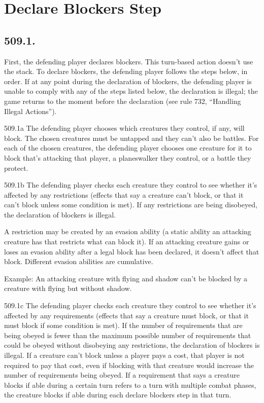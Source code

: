 \section{Declare Blockers Step}
\subsection*{509.1.}
First, the defending player declares blockers. This turn-based action doesn’t use the stack. To declare blockers, the defending player follows the steps below, in order. If at any point during the declaration of blockers, the defending player is unable to comply with any of the steps listed below, the declaration is illegal; the game returns to the moment before the declaration (see rule 732, “Handling Illegal Actions”).

509.1a The defending player chooses which creatures they control, if any, will block. The chosen creatures must be untapped and they can’t also be battles. For each of the chosen creatures, the defending player chooses one creature for it to block that’s attacking that player, a planeswalker they control, or a battle they protect.

509.1b The defending player checks each creature they control to see whether it’s affected by any restrictions (effects that say a creature can’t block, or that it can’t block unless some condition is met). If any restrictions are being disobeyed, the declaration of blockers is illegal.

A restriction may be created by an evasion ability (a static ability an attacking creature has that restricts what can block it). If an attacking creature gains or loses an evasion ability after a legal block has been declared, it doesn’t affect that block. Different evasion abilities are cumulative.

Example: An attacking creature with flying and shadow can’t be blocked by a creature with flying but without shadow.

509.1c The defending player checks each creature they control to see whether it’s affected by any requirements (effects that say a creature must block, or that it must block if some condition is met). If the number of requirements that are being obeyed is fewer than the maximum possible number of requirements that could be obeyed without disobeying any restrictions, the declaration of blockers is illegal. If a creature can’t block unless a player pays a cost, that player is not required to pay that cost, even if blocking with that creature would increase the number of requirements being obeyed. If a requirement that says a creature blocks if able during a certain turn refers to a turn with multiple combat phases, the creature blocks if able during each declare blockers step in that turn.

